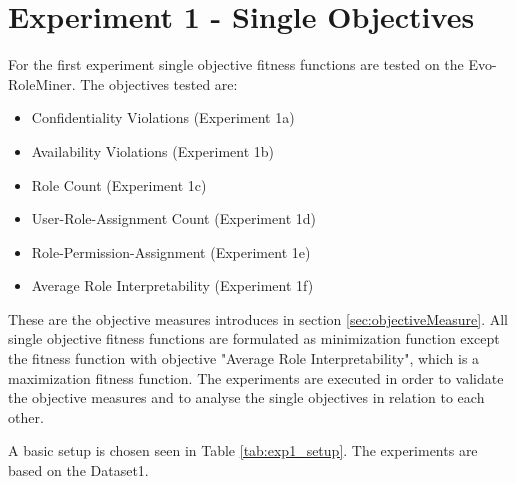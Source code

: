 \section{Experiment 1 - Single Objectives}
\label{sec:exp1}
For the first experiment single objective fitness functions are tested on the Evo-RoleMiner. The objectives tested are:
\begin{itemize}
	\item Confidentiality Violations (Experiment 1a)
	\item Availability Violations (Experiment 1b)
	\item Role Count (Experiment 1c)
	\item User-Role-Assignment Count (Experiment 1d)
	\item Role-Permission-Assignment (Experiment 1e)
	\item Average Role Interpretability (Experiment 1f)
\end{itemize}
These are the objective measures introduces in section \ref{sec:objectiveMeasure}. All single objective fitness functions are formulated as minimization function except the fitness function with objective "Average Role Interpretability", which is a maximization fitness function.
The experiments are executed in order to validate the objective measures and to analyse the single objectives in relation to each other.

A basic setup is chosen seen in Table \ref{tab:exp1_setup}. The experiments are based on the Dataset1.

